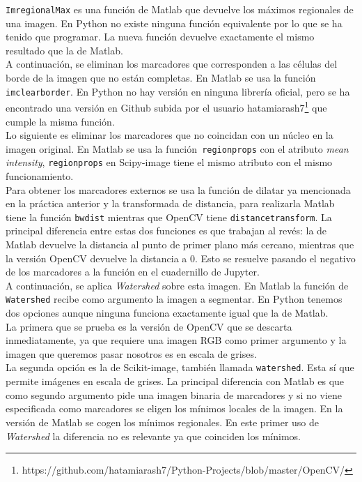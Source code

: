 \documentclass[a4paper,12pt]{report}
\begin{document}
\texttt{ImregionalMax} es una función de Matlab que devuelve los máximos regionales de una imagen. En Python no existe ninguna función equivalente por lo que se ha tenido que programar. La nueva función devuelve exactamente el mismo resultado que la de Matlab.\\

A continuación, se eliminan los marcadores que corresponden a las células del borde de la imagen que no están completas. En Matlab se usa la función \texttt{imclearborder}. En Python no hay versión en ninguna librería oficial, pero se ha encontrado una versión en Github subida por el usuario hatamiarash7\footnote{https://github.com/hatamiarash7/Python-Projects/blob/master/OpenCV/} que cumple la misma función.\\

Lo siguiente es eliminar los marcadores que no coincidan con un núcleo en la imagen original. En Matlab se usa la función\texttt{ regionprops} con el atributo \emph{mean intensity}, \texttt{regionprops} en Scipy-image tiene el mismo atributo con el mismo funcionamiento.\\

Para obtener los marcadores externos se usa la función de dilatar ya mencionada en la práctica anterior y la transformada de distancia, para realizarla Matlab tiene la función \texttt{bwdist} mientras que OpenCV tiene \texttt{distancetransform}. La principal diferencia entre estas dos funciones es que trabajan al revés: la de Matlab devuelve la distancia al punto de primer plano más cercano, mientras que la versión OpenCV devuelve la distancia a 0. Esto se resuelve pasando el negativo de los marcadores a la función en el cuadernillo de Jupyter.\\

A continuación, se aplica \emph{Watershed} sobre esta imagen. En Matlab la función de \texttt{Watershed} recibe como argumento la imagen a segmentar. En Python tenemos dos opciones aunque ninguna funciona exactamente igual que la de Matlab.\\

La primera que se prueba es la versión de OpenCV que se descarta inmediatamente, ya que requiere una imagen RGB como primer argumento y la imagen que queremos pasar nosotros es en escala de grises.\\

La segunda opción es la de Scikit-image, también llamada \texttt{watershed}. Esta sí que permite imágenes en escala de grises. La principal diferencia con Matlab es que como segundo argumento pide una imagen binaria de marcadores y si no viene especificada como marcadores se eligen los mínimos locales de la imagen. En la versión de Matlab se cogen los mínimos regionales. En este primer uso de \emph{Watershed} la diferencia no es relevante ya que coinciden los mínimos.\\
\end{document}
